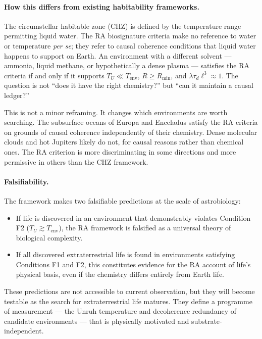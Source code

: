 \documentclass[11pt,a4paper]{article}
\theoremstyle{plain}
\theoremstyle{definition}
\theoremstyle{remark}
\begin{document}
\paragraph{How this differs from existing habitability frameworks.}
The circumstellar habitable zone (CHZ) is defined by the temperature range
permitting liquid water. The RA biosignature criteria make no reference to
water or temperature \emph{per se}; they refer to causal coherence conditions
that liquid water happens to support on Earth. An environment with a different
solvent --- ammonia, liquid methane, or hypothetically a dense plasma ---
satisfies the RA criteria if and only if it supports $T_U \ll T_{\mathrm{env}}$,
$R \geq R_{\min}$, and $\lambda\tau_d\ell^3 \approx 1$. The question is not
``does it have the right chemistry?'' but ``can it maintain a causal ledger?''

This is not a minor reframing. It changes which environments are worth
searching. The subsurface oceans of Europa and Enceladus satisfy the RA
criteria on grounds of causal coherence independently of their chemistry.
Dense molecular clouds and hot Jupiters likely do not, for causal reasons
rather than chemical ones. The RA criterion is more discriminating in some
directions and more permissive in others than the CHZ framework.

\paragraph{Falsifiability.}
The framework makes two falsifiable predictions at the scale of astrobiology:
\begin{itemize}[noitemsep]
  \item If life is discovered in an environment that demonstrably violates
  Condition F2 ($T_U \gtrsim T_{\mathrm{env}}$), the RA framework is falsified
  as a universal theory of biological complexity.
  \item If all discovered extraterrestrial life is found in environments
  satisfying Conditions F1 and F2, this constitutes evidence for the RA
  account of life's physical basis, even if the chemistry differs
  entirely from Earth life.
\end{itemize}
These predictions are not accessible to current observation, but they will
become testable as the search for extraterrestrial life matures. They define
a programme of measurement --- the Unruh temperature and decoherence
redundancy of candidate environments --- that is physically motivated and
substrate-independent.
\end{document}
